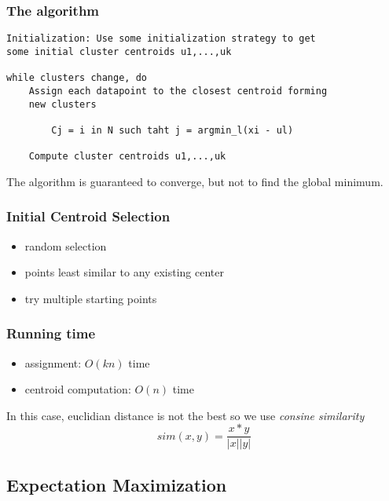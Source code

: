 \documentclass[11pt]{article}
\begin{document}
\subsubsection{The algorithm}\label{the-algorithm}

\begin{verbatim}
Initialization: Use some initialization strategy to get
some initial cluster centroids u1,...,uk

while clusters change, do
    Assign each datapoint to the closest centroid forming
    new clusters

        Cj = i in N such taht j = argmin_l(xi - ul)

    Compute cluster centroids u1,...,uk
\end{verbatim}

The algorithm is guaranteed to converge, but not to find the global
minimum.

\subsubsection{Initial Centroid
Selection}\label{initial-centroid-selection}

\begin{itemize}
\tightlist
\item
  random selection
\item
  points least similar to any existing center
\item
  try multiple starting points
\end{itemize}

\subsubsection{Running time}\label{running-time}

\begin{itemize}
\tightlist
\item
  assignment: \(O(kn)\) time
\item
  centroid computation: \(O(n)\) time
\end{itemize}

In this case, euclidian distance is not the best so we use \emph{consine
similarity} \[sim(x, y)=\frac{x*y}{|x||y|}\]

\subsection{Expectation Maximization}\label{expectation-maximization}
\end{document}
